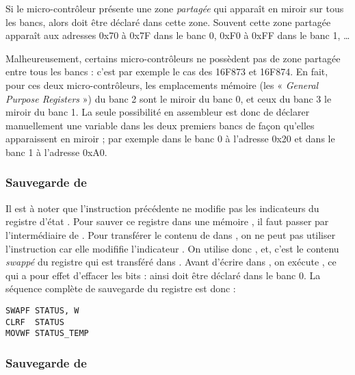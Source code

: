 Si le micro-contrôleur présente une zone \emph{partagée} qui apparaît en miroir sur tous les bancs, alors  doit être déclaré dans cette zone. Souvent cette zone partagée apparaît aux adresses 0x70 à 0x7F dans le banc 0, 0xF0 à 0xFF dans le banc 1, …

Malheureusement, certains micro-contrôleurs ne possèdent pas de zone partagée entre tous les bancs : c'est par exemple le cas des 16F873 et 16F874. En fait, pour ces deux micro-contrôleurs, les emplacements mémoire (les « \emph{General Purpose Registers} ») du banc 2 sont le miroir du banc 0, et ceux du banc 3 le miroir du banc 1. La seule possibilité en assembleur est donc de déclarer manuellement une variable dans les deux premiers bancs de façon qu'elles apparaissent en miroir ; par exemple  dans le banc 0 à l'adresse 0x20 et  dans le banc 1 à l'adresse 0xA0.


\subsubsection{Sauvegarde de }

Il est à noter que l'instruction précédente  ne modifie pas les indicateurs du registre d'état . Pour sauver ce registre dans une mémoire , il faut passer par l'intermédiaire de . Pour transférer le contenu de  dans , on ne peut pas utiliser l'instruction  car elle modififie l'indicateur . On utilise donc , et, c'est le contenu \emph{swappé} du registre  qui est transféré dans . Avant d'écrire  dans , on exécute , ce qui a pour effet d'effacer les bits  : ainsi  doit être déclaré dans le banc 0. La séquence complète de sauvegarde du registre  est donc :

\begin{lstlisting}[language=assembleur]
SWAPF STATUS, W
CLRF  STATUS
MOVWF STATUS_TEMP 
\end{lstlisting}

\subsubsection{Sauvegarde de }

